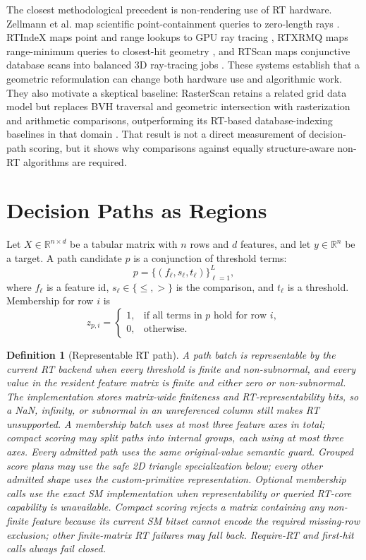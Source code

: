 \documentclass[11pt]{article}
\newtheorem{definition}{Definition}
\newcommand{\R}{\mathbb{R}}
\begin{document}
The closest methodological precedent is non-rendering use of RT hardware.
Zellmann et al. map scientific point-containment queries to zero-length rays
\cite{zellmann2022point}. RTIndeX maps point and range lookups to GPU ray
tracing \cite{henneberg2023rtindex}, RTXRMQ maps range-minimum queries to
closest-hit geometry \cite{meneses2023rtxrmq}, and RTScan maps conjunctive
database scans into balanced 3D ray-tracing jobs \cite{lv2024rtscan}. These
systems establish that a geometric reformulation can change both hardware use
and algorithmic work. They also motivate a skeptical baseline: RasterScan
retains a related grid data model but replaces BVH traversal and geometric
intersection with rasterization and arithmetic comparisons, outperforming its
RT-based database-indexing baselines in that domain \cite{doraiswamy2026raster}.
That result is not a direct measurement of decision-path scoring, but it shows
why comparisons against equally structure-aware non-RT algorithms are required.

\section{Decision Paths as Regions}

Let $X \in \R^{n \times d}$ be a tabular matrix with $n$ rows and $d$ features,
and let $y \in \R^n$ be a target. A path candidate $p$ is a conjunction of
threshold terms:
\[
  p = \{(f_\ell, s_\ell, t_\ell)\}_{\ell=1}^{L},
\]
where $f_\ell$ is a feature id, $s_\ell \in \{\le, >\}$ is the comparison, and
$t_\ell$ is a threshold. Membership for row $i$ is
\[
  z_{p,i} =
  \begin{cases}
    1, & \text{if all terms in } p \text{ hold for row } i,\\
    0, & \text{otherwise.}
  \end{cases}
\]

\begin{definition}[Representable RT path]
A path batch is representable by the current RT backend when every threshold is
finite and non-subnormal, and every value in the resident feature matrix is
finite and either zero or non-subnormal. The implementation stores matrix-wide
finiteness and RT-representability bits, so a NaN, infinity, or subnormal in an
unreferenced column still makes RT unsupported. A membership batch uses at
most three feature axes in total; compact scoring may split paths into internal
groups, each using at most three axes. Every admitted path uses the same
original-value semantic guard. Grouped score plans may use the safe 2D triangle
specialization below; every other admitted shape uses the custom-primitive
representation. Optional membership calls use the exact SM
implementation when representability or queried RT-core capability is
unavailable. Compact scoring rejects a matrix containing any non-finite feature
because its current SM bitset cannot encode the required missing-row exclusion;
other finite-matrix RT failures may fall back. Require-RT and first-hit calls
always fail closed.
\end{definition}
\end{document}
